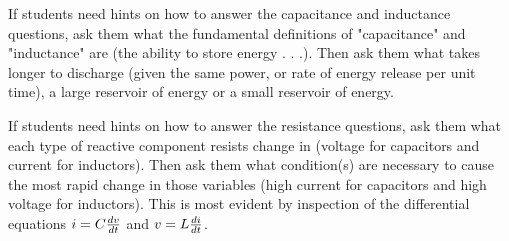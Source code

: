 If students need hints on how to answer the capacitance and inductance questions, ask them what the fundamental definitions of "capacitance" and "inductance" are (the ability to store energy . . .).  Then ask them what takes longer to discharge (given the same power, or rate of energy release per unit time), a large reservoir of energy or a small reservoir of energy.

If students need hints on how to answer the resistance questions, ask them what each type of reactive component resists change in (voltage for capacitors and current for inductors).  Then ask them what condition(s) are necessary to cause the most rapid change in those variables (high current for capacitors and high voltage for inductors).  This is most evident by inspection of the differential equations $i = C{dv \over dt}$ and $v = L {di \over dt}$.





